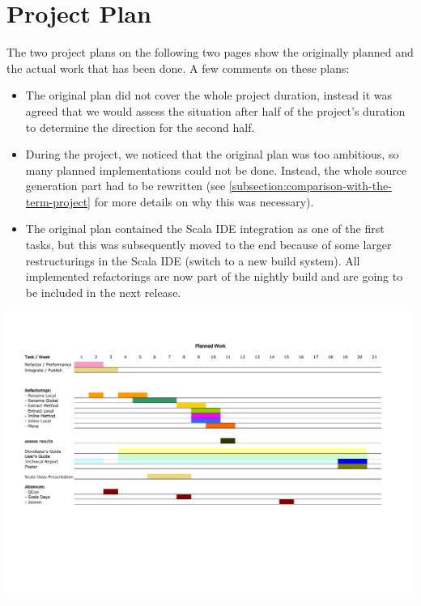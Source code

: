 \documentclass[10pt,a4paper,oneside]{scrreprt}
\begin{document}
\section{Project Plan}

The two project plans on the following two pages show the originally planned and the actual work that has been done. A few comments on these plans:

\begin{itemize}
  \item The original plan did not cover the whole project duration, instead it was agreed that we would assess the situation after half of the project's duration to determine the direction for the second half. 
  \item During the project, we noticed that the original plan was too ambitious, so many planned implementations could not be done. Instead, the whole source generation part had to be rewritten (see \vref{subsection:comparison-with-the-term-project} for more details on why this was necessary).
  \item The original plan contained the Scala IDE integration as one of the first tasks, but this was subsequently moved to the end because of some larger restructurings in the Scala IDE (switch to a new build system). All implemented refactorings are now part of the nightly build and are going to be included in the next release.
\end{itemize}



\newpage
\thispagestyle{empty}
\enlargethispage{5cm}
\begin{center}
  \includegraphics[width=1.7\linewidth,angle=90]{project_plan_1.pdf}
\end{center}
\end{document}
